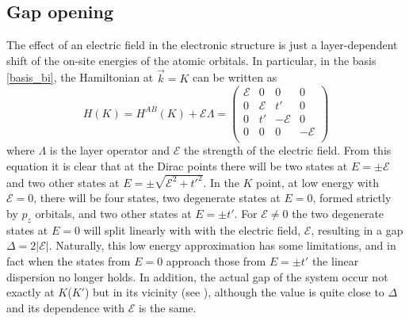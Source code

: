 \subsection{Gap opening}
The effect of an electric field in the electronic structure is just a layer-dependent shift of the on-site energies of the atomic orbitals. In particular, in the basis \eqref{basis_bi}, the Hamiltonian at $\vec{k}=K$ can be written as
\begin{equation}
   H(K) = H^{AB}(K)+\mathcal{E}\Lambda = \left(
   \begin{array}{cc|cc}
     \mathcal{E} & 0 & 0 & 0\\
     0 & \mathcal{E} & t' & 0\\ \hline
     0 & t' & -\mathcal{E} & 0\\
     0 & 0 & 0 & -\mathcal{E}\\
   \end{array}\right)
\label{Helec}
\end{equation}
where $\Lambda$ is the layer operator and $\mathcal{E}$ the strength of the electric field. From this equation it is clear that at the Dirac points there will be two states at $E=\pm\mathcal{E}$ and two other states at $E=\pm\sqrt{\mathcal{E}^2+t'^{2}}$. In the $K$ point, at low energy with $\mathcal{E}=0$, there will be four states, two degenerate states at $E=0$, formed strictly by $p_z$ orbitals, and two other states at $E=\pm t'$.
For $\mathcal{E}\neq 0$ the two degenerate states at $E=0$ will split linearly with with the electric field, $\mathcal{E}$, resulting in a gap $\Delta = 2|\mathcal{E}|$.
Naturally, this low energy approximation has some limitations, and in fact when the states from $E=0$ approach those from $E=\pm t'$ the linear dispersion no longer holds.
In addition, the actual gap of the system occur not exactly at $K$($K'$) but in its vicinity (see ), although the value is quite close to $\Delta$ and its dependence with $\mathcal{E}$ is the same.




